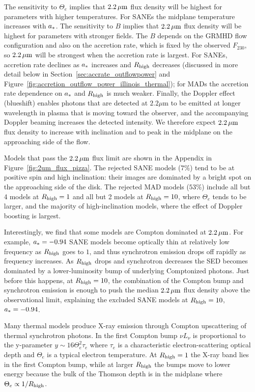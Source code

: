 The sensitivity to $\Theta_e$ implies that $2.2\,\mu\mathrm{m}$ flux density will be highest for parameters with higher temperatures.
For SANEs the midplane temperature increases with $a_*$.
The sensitivity to $B$ implies that $2.2\,\mu\mathrm{m}$ flux density will be highest for parameters with stronger fields.
The $B$ depends on the GRMHD flow configuration and also on the accretion rate, which is fixed by the observed $F_{230}$, so $2.2\,\mu\mathrm{m}$ will be strongest when the accretion rate is largest.
For SANEs, accretion rate declines as $a_*$ increases and $R_\mathrm{high}$ decreases (discussed in more detail below in  Section~\ref{sec:accrate_outflowpower} and Figure~\ref{fig:accretion_outflow_power_illinois_thermal}); for MADs the accretion rate dependence on $a_*$ and $R_\mathrm{high}$ is much weaker.
Finally, the Doppler effect (blueshift) enables photons that are detected at $2.2\mu$m to be emitted at longer wavelength in plasma that is moving toward the observer, and the accompanying Doppler beaming increases the detected intensity.
We therefore expect $2.2\,\mu\mathrm{m}$ flux density to increase with inclination and to peak in the midplane on the approaching side of the flow.

Models that pass the $2.2\,\mu\mathrm{m}$ flux limit are shown in the Appendix in Figure~\ref{fig:2um_flux_pizza}.
The rejected SANE models ($7\%$) tend to be at positive spin and high inclination: their images are dominated by a bright spot on the approaching side of the disk.
The rejected MAD models ($53\%$) include all but 4 models at $R_\mathrm{high} = 1$ and all but 2 models at $R_\mathrm{high} = 10$, where $\Theta_e$ tends to be larger, and the majority of high-inclination models, where the effect of Doppler boosting is largest.

Interestingly, we find that some models are Compton dominated at $2.2\,\mu\mathrm{m}$.
For example, $a_* = -0.94$ SANE models become optically thin at relatively low frequency as $R_\mathrm{high}$ goes to $1$, and thus synchrotron emission drops off rapidly as frequency increases.
As $R_\mathrm{high}$ drops and synchrotron decreases the SED becomes dominated by a lower-luminosity bump of underlying Comptonized photons.
Just before this happens, at $R_\mathrm{high} = 10$, the combination of the Compton bump and synchrotron emission is enough to push the median $2.2\,\mu\mathrm{m}$ flux density above the observational limit, explaining the excluded SANE models at $R_\mathrm{high} = 10$, $a_* = -0.94$.


Many thermal models produce X-ray emission through Compton upscattering of thermal synchrotron photons.
In the first Compton bump $\nu L_\nu$ is proportional to the y-parameter $y \sim 16 \Theta_e^2 \tau_e$ where $\tau_e$ is a characteristic electron-scattering optical depth and $\Theta_e$ is a typical electron temperature.
At $R_\mathrm{high} = 1$ the X-ray band lies in the first Compton bump, while at larger $R_\mathrm{high}$ the bumps move to lower energy because the bulk of the Thomson depth is in the midplane where $\Theta_e \propto 1/R_\mathrm{high}$.

